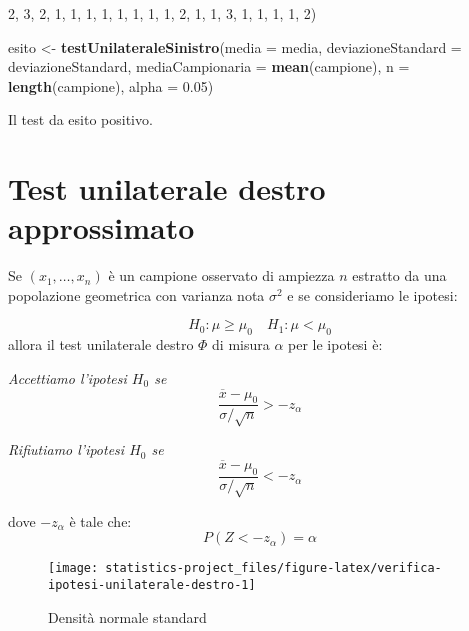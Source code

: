 \documentclass[]{book}
\newenvironment{Shaded}{\begin{snugshade}}{\end{snugshade}}
\newcommand{\KeywordTok}[1]{\textcolor[rgb]{0.13,0.29,0.53}{\textbf{#1}}}
\newcommand{\DataTypeTok}[1]{\textcolor[rgb]{0.13,0.29,0.53}{#1}}
\newcommand{\DecValTok}[1]{\textcolor[rgb]{0.00,0.00,0.81}{#1}}
\newcommand{\FloatTok}[1]{\textcolor[rgb]{0.00,0.00,0.81}{#1}}
\newcommand{\StringTok}[1]{\textcolor[rgb]{0.31,0.60,0.02}{#1}}
\newcommand{\NormalTok}[1]{#1}
\begin{document}
\begin{Shaded}
\begin{Highlighting}[]
              \DecValTok{2}\NormalTok{, }\DecValTok{3}\NormalTok{, }\DecValTok{2}\NormalTok{, }\DecValTok{1}\NormalTok{, }\DecValTok{1}\NormalTok{, }\DecValTok{1}\NormalTok{, }\DecValTok{1}\NormalTok{, }\DecValTok{1}\NormalTok{, }\DecValTok{1}\NormalTok{, }\DecValTok{1}\NormalTok{, }\DecValTok{1}\NormalTok{, }\DecValTok{2}\NormalTok{, }\DecValTok{1}\NormalTok{, }\DecValTok{1}\NormalTok{, }\DecValTok{3}\NormalTok{, }\DecValTok{1}\NormalTok{, }\DecValTok{1}\NormalTok{, }\DecValTok{1}\NormalTok{, }\DecValTok{1}\NormalTok{, }\DecValTok{2}\NormalTok{)}

\NormalTok{esito <-}\StringTok{ }\KeywordTok{testUnilateraleSinistro}\NormalTok{(}\DataTypeTok{media =}\NormalTok{ media, }
                                 \DataTypeTok{deviazioneStandard =}\NormalTok{ deviazioneStandard, }
                                 \DataTypeTok{mediaCampionaria =} \KeywordTok{mean}\NormalTok{(campione), }
                                 \DataTypeTok{n =} \KeywordTok{length}\NormalTok{(campione), }
                                 \DataTypeTok{alpha =} \FloatTok{0.05}\NormalTok{)}
\end{Highlighting}
\end{Shaded}

Il test da esito positivo.

\section{Test unilaterale destro
approssimato}\label{test-unilaterale-destro-approssimato}

Se \((x_1,\dots,x_n)\) è un campione osservato di ampiezza \(n\)
estratto da una popolazione geometrica con varianza nota \(\sigma^2\) e
se consideriamo le ipotesi:

\[H_0 : \mu \ge \mu_0 \quad H_1 : \mu < \mu_0\] allora il test
unilaterale destro \(\Phi\) di misura \(\alpha\) per le ipotesi è:

\emph{Accettiamo l'ipotesi \(H_0\) se}
\[\frac{\overline x - \mu_0}{\sigma / \sqrt{n}} > - z_{\alpha}\]

\emph{Rifiutiamo l'ipotesi \(H_0\) se}
\[\frac{\overline x - \mu_0}{\sigma / \sqrt{n}} < -z_{\alpha}\]

dove \(-z_{\alpha}\) è tale che: \[P(Z < -z_{\alpha}) = \alpha\]

\begin{figure}

{\centering \texttt{[image: statistics-project\_files/figure-latex/verifica-ipotesi-unilaterale-destro-1]} 

}

\caption{Densità normale standard}\label{fig:verifica-ipotesi-unilaterale-destro}
\end{figure}
\end{document}
